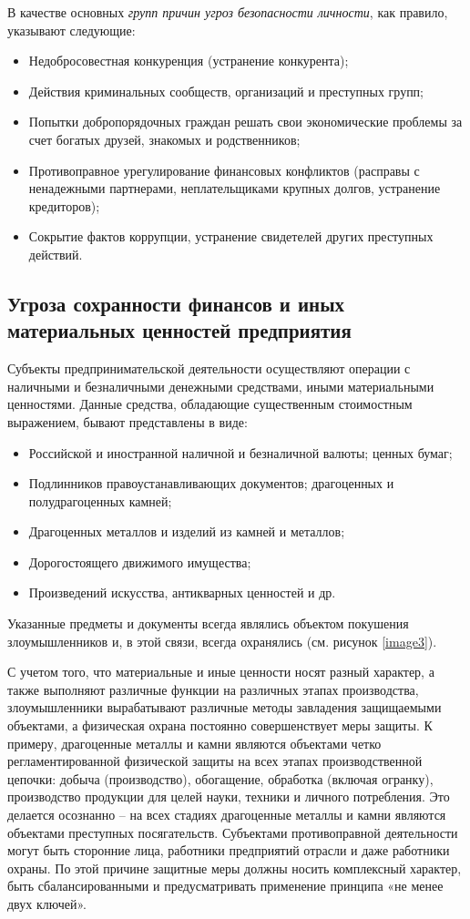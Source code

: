 \documentclass[a4paper,12pt,fleqn]{article} %
\begin{document}
В качестве основных \textit{групп причин угроз безопасности личности}, как правило, указывают следующие:
\begin{itemize}
	\item Недобросовестная конкуренция (устранение конкурента);
	\item Действия криминальных сообществ, организаций и преступных групп; 
	\item Попытки добропорядочных граждан решать свои экономические проблемы за счет богатых друзей, знакомых и родственников;
	\item Противоправное урегулирование финансовых конфликтов (расправы с ненадежными партнерами, неплательщиками крупных долгов, устранение кредиторов);
	\item Сокрытие фактов коррупции, устранение свидетелей других преступных действий.
\end{itemize}

\subsection{Угроза сохранности финансов и иных материальных ценностей предприятия}

Субъекты предпринимательской деятельности осуществляют операции с наличными и безналичными денежными средствами, иными материальными ценностями. Данные средства, обладающие существенным стоимостным выражением, бывают представлены в виде: 
\begin{itemize}
	\item Российской и иностранной наличной и безналичной валюты; ценных бумаг; 
	\item Подлинников правоустанавливающих документов; драгоценных и полудрагоценных камней;
	\item Драгоценных металлов и изделий из камней и металлов;
	\item Дорогостоящего движимого имущества; 
	\item Произведений искусства, антикварных ценностей и др. 
\end{itemize}
	
Указанные предметы и документы всегда являлись объектом покушения злоумышленников и, в этой связи, всегда охранялись (см. рисунок \ref{image3}).

С учетом того, что материальные и иные ценности носят разный характер, а также выполняют различные функции на различных этапах производства, злоумышленники вырабатывают различные методы завладения защищаемыми объектами, а физическая охрана постоянно совершенствует меры защиты. К примеру, драгоценные металлы и камни являются объектами четко регламентированной физической защиты на всех этапах производственной цепочки: добыча (производство), обогащение, обработка (включая огранку), производство продукции для целей науки, техники и личного потребления. Это делается осознанно – на всех стадиях драгоценные металлы и камни являются объектами преступных посягательств. Субъектами противоправной деятельности могут быть сторонние лица, работники предприятий отрасли и даже работники охраны. По этой причине защитные меры должны носить комплексный характер, быть сбалансированными и предусматривать применение принципа «не менее двух ключей».
\end{document}
